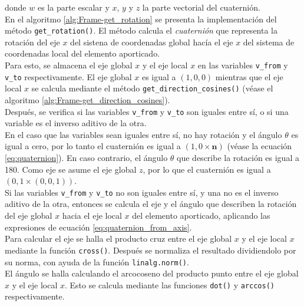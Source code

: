 donde $ w $ es la parte escalar y $ x $, $ y $ y $ z $ la parte vectorial del cuaternión.\\

En el algoritmo \ref{alg:Frame-get_rotation} se presenta la implementación del método \verb|get_rotation()|. El método calcula el \emph{cuaternión} que representa la rotación del eje $ x $ del sistena de coordenadas global hacía el eje $ x $ del sistema de coordenadas local del elemento aporticado.\\

Para esto, se almacena el eje global $ x $ y el eje local $ x $ en las variables \verb|v_from| y \verb|v_to| respectivamente. El eje global $ x $ es igual a $ (1, 0, 0) $ mientras que el eje local $ x $ se calcula mediante el método \verb|get_direction_cosines()| (véase el algoritmo \ref{alg:Frame-get_direction_cosines}).\\

Después, se verifica si las variables \verb|v_from| y \verb|v_to| son iguales entre sí, o si una variable es el inverso aditivo de la otra.\\

En el caso que las variables sean iguales entre sí, no hay rotación y el ángulo $ \theta $ es igual a cero, por lo tanto el cuaternión es igual a $ (1, 0 \times \mathbf{n}) $ (véase la ecuación \ref{eq:quaternion}). En caso contrario, el ángulo $ \theta $ que describe la rotación es igual a 180\degree. Como eje se asume el eje global $ z $, por lo que el cuaternión es igual a $ (0, 1 \times (0, 0, 1)) $.\\

Si las variables \verb|v_from| y \verb|v_to| no son iguales entre sí, y una no es el inverso aditivo de la otra, entonces se calcula el eje y el ángulo que describen la rotación del eje global $ x $ hacia el eje local $ x $ del elemento aporticado, aplicando las expresiones de ecuación \eqref{eq:quaternion_from_axis}.\\

Para calcular el eje se halla el producto cruz entre el eje global $ x $ y el eje local $ x $ mediante la función \verb|cross()|. Después se normaliza el resultado dividiendolo por su norma, con ayuda de la función \verb|linalg.norm()|.\\

El ángulo se halla calculando el arcocoseno del producto punto entre el eje global $ x $ y el eje local $ x $. Esto se calcula mediante las funciones \verb|dot()| y \verb|arccos()| respectivamente.\\

